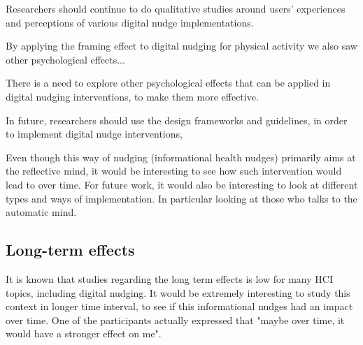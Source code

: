 Researchers should continue to do qualitative studies around users' experiences and perceptions of various digital nudge implementations. 

By applying the framing effect to digital nudging for physical activity we also saw other psychological effects... 

There is a need to explore other psychological effects that can be applied in digital nudging interventions, to make them more effective.

In future, researchers should use the design frameworks and guidelines, in order to implement digital nudge interventions, 

Even though this way of nudging (informational health nudges) primarily aims at the reflective mind, it would be interesting to see how such intervention would lead to over time.  For future work, it would also be interesting to look at different types and ways of implementation. In particular looking at those who talks to the automatic mind. 



\subsection{Long-term effects}
It is known that studies regarding the long term effects is low for many HCI topics, including digital nudging. It would be extremely interesting to study this context in longer time interval, to see if this informational nudges had an impact over time. One of the participants actually expressed that "maybe over time, it would have a stronger effect on me". 